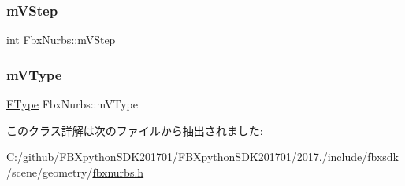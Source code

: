 \mbox{\label{class_fbx_nurbs_a209ec06ea941b6dea3f68d85b3461d21}} 
\subsubsection{\texorpdfstring{m\+V\+Step}{mVStep}}
{\footnotesize\ttfamily int Fbx\+Nurbs\+::m\+V\+Step\hspace{0.3cm}{\ttfamily [protected]}}

\mbox{\label{class_fbx_nurbs_ad973e3ca7ca7a3d6d3be94e46153a55b}} 
\subsubsection{\texorpdfstring{m\+V\+Type}{mVType}}
{\footnotesize\ttfamily \hyperlink{class_fbx_nurbs_a16d9562676c9d3511503551790c55643}{E\+Type} Fbx\+Nurbs\+::m\+V\+Type\hspace{0.3cm}{\ttfamily [protected]}}



このクラス詳解は次のファイルから抽出されました\+:\begin{DoxyCompactItemize}
\item 
C\+:/github/\+F\+B\+Xpython\+S\+D\+K201701/\+F\+B\+Xpython\+S\+D\+K201701/2017./include/fbxsdk/scene/geometry/\hyperlink{fbxnurbs_8h}{fbxnurbs.\+h}\end{DoxyCompactItemize}
